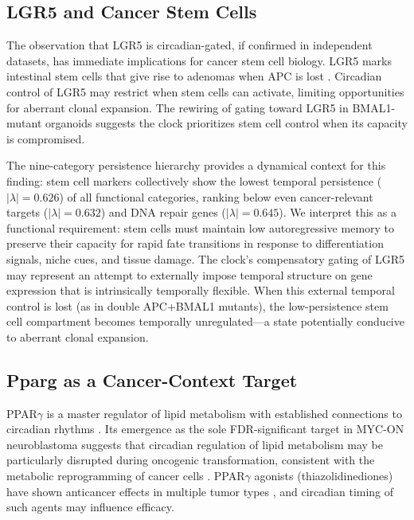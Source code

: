 \documentclass[11pt,letterpaper]{article}
\begin{document}
\subsection{LGR5 and Cancer Stem Cells}

The observation that LGR5 is circadian-gated, if confirmed in independent datasets, has immediate implications for cancer stem cell biology. LGR5 marks intestinal stem cells that give rise to adenomas when APC is lost \citep{barker2007}. Circadian control of LGR5 may restrict when stem cells can activate, limiting opportunities for aberrant clonal expansion. The rewiring of gating toward LGR5 in BMAL1-mutant organoids suggests the clock prioritizes stem cell control when its capacity is compromised.

The nine-category persistence hierarchy \citep{whiteside2026paper1} provides a dynamical context for this finding: stem cell markers collectively show the lowest temporal persistence ($|\lambda| = 0.626$) of all functional categories, ranking below even cancer-relevant targets ($|\lambda| = 0.632$) and DNA repair genes ($|\lambda| = 0.645$). We interpret this as a functional requirement: stem cells must maintain low autoregressive memory to preserve their capacity for rapid fate transitions in response to differentiation signals, niche cues, and tissue damage. The clock's compensatory gating of LGR5 may represent an attempt to externally impose temporal structure on gene expression that is intrinsically temporally flexible. When this external temporal control is lost (as in double APC+BMAL1 mutants), the low-persistence stem cell compartment becomes temporally unregulated---a state potentially conducive to aberrant clonal expansion.

\subsection{Pparg as a Cancer-Context Target}

PPAR$\gamma$ is a master regulator of lipid metabolism with established connections to circadian rhythms \citep{wang2008, yang2006}. Its emergence as the sole FDR-significant target in MYC-ON neuroblastoma suggests that circadian regulation of lipid metabolism may be particularly disrupted during oncogenic transformation, consistent with the metabolic reprogramming of cancer cells \citep{hanahan2011, pavlova2016}. PPAR$\gamma$ agonists (thiazolidinediones) have shown anticancer effects in multiple tumor types \citep{michalik2004}, and circadian timing of such agents may influence efficacy.
\end{document}
